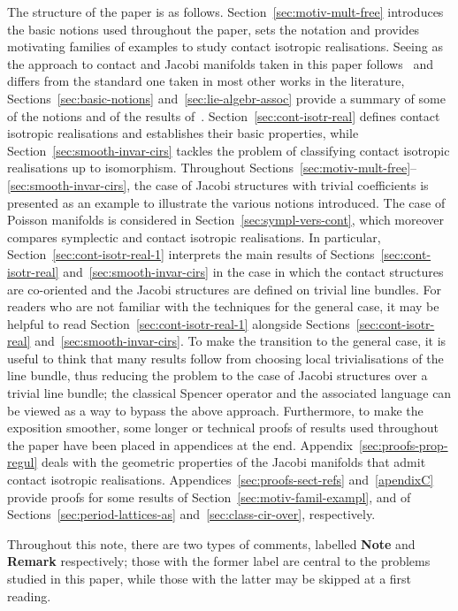 \documentclass[10pt,a4paper]{amsart}
\numberwithin{equation}{section}
\begin{document}
 The structure of the paper is as follows. Section~\ref{sec:motiv-mult-free} introduces the basic notions used throughout the paper, sets the notation and provides motivating families of examples to study contact isotropic realisations. Seeing as the approach to contact and Jacobi manifolds taken in this paper follows~\cite{Maria-Crainic} and dif\/fers from the standard one taken in most other works in the literature, Sections~\ref{sec:basic-notions} and~\ref{sec:lie-algebr-assoc} provide a summary of some of the notions and of the results of~\cite{Maria-Crainic}. Section~\ref{sec:cont-isotr-real} def\/ines contact isotropic realisations and establishes their basic properties, while Section~\ref{sec:smooth-invar-cirs} tackles the problem of classifying contact isotropic realisations up to isomorphism. Throughout Sections~\ref{sec:motiv-mult-free}--\ref{sec:smooth-invar-cirs}, the case of Jacobi structures with trivial coef\/f\/icients is presented as an example to illustrate the various notions introduced. The case of Poisson manifolds is considered in Section~\ref{sec:sympl-vers-cont}, which moreover compares symplectic and contact isotropic realisations. In particular, Section~\ref{sec:cont-isotr-real-1} interprets the main results of Sections~\ref{sec:cont-isotr-real} and~\ref{sec:smooth-invar-cirs} in the case in which the contact structures are co-oriented and the Jacobi structures are def\/ined on trivial line bundles. For readers who are not familiar with the techniques for the general case, it may be helpful to read Section~\ref{sec:cont-isotr-real-1} alongside Sections~\ref{sec:cont-isotr-real} and~\ref{sec:smooth-invar-cirs}. To make the transition to the general case, it is useful to think that many results follow from choosing local trivialisations of the line bundle, thus reducing the problem to the case of Jacobi structures over a trivial line bundle; the classical Spencer operator and the associated language can be viewed as a way to bypass the above approach. Furthermore, to make the exposition smoother, some longer or technical proofs of results used throughout the paper have been placed in appendices at the end. Appendix~\ref{sec:proofs-prop-regul} deals with the geometric properties of the Jacobi manifolds that admit contact isotropic realisations. Appendices~\ref{sec:proofs-sect-refs} and~\ref{apendixC} provide proofs for some results of Section~\ref{sec:motiv-famil-exampl}, and of Sections~\ref{sec:period-lattices-as} and~\ref{sec:class-cir-over}, respectively.

Throughout this note, there are two types of comments, labelled {\bf Note} and {\bf Remark} respectively; those with the former label are central to the problems studied in this paper, while those with the latter may be skipped at a f\/irst reading.
\end{document}
